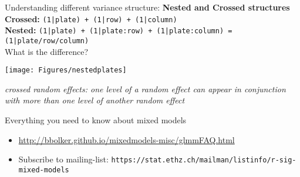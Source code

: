 \documentclass{beamer}
\begin{document}
\begin{frame}{Understanding different variance structure: \textbf{Nested and Crossed structures}} 
\textbf{Crossed:} \texttt{(1|plate) + (1|row) + (1|column)}\\
\vspace{0.2cm}
\textbf{Nested:} \texttt{(1|plate) + (1|plate:row) + (1|plate:column) = (1|plate/row/column)}\\

What is the difference?

 \begin{center}
  \texttt{[image: Figures/nestedplates]}
 \end{center}

 \textit{crossed random effects: one level of a random effect can appear in conjunction with more than one level of another random effect}
\end{frame}



\begin{frame}{Everything you need to know about mixed models}

\begin{itemize}
 \item \url{http://bbolker.github.io/mixedmodels-misc/glmmFAQ.html}
 \item Subscribe to mailing-list: \texttt{https://stat.ethz.ch/mailman/listinfo/r-sig-mixed-models}
\end{itemize}

\end{frame}
\end{document}
